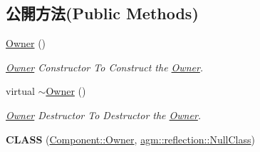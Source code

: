 \subsection*{公開方法(Public Methods)}
\begin{DoxyCompactItemize}
\item 
\hyperlink{class_magnum_1_1_component_1_1_owner_aca1a7487123900c93da0de29a5974f8b}{Owner} ()\hypertarget{class_magnum_1_1_component_1_1_owner_aca1a7487123900c93da0de29a5974f8b}{}\label{class_magnum_1_1_component_1_1_owner_aca1a7487123900c93da0de29a5974f8b}

\begin{DoxyCompactList}\small\item\em \hyperlink{class_magnum_1_1_component_1_1_owner}{Owner} Constructor To Construct the \hyperlink{class_magnum_1_1_component_1_1_owner}{Owner}. \end{DoxyCompactList}\item 
virtual \hyperlink{class_magnum_1_1_component_1_1_owner_af1b9c8d2c072df49f7db39592e016b44}{$\sim$\+Owner} ()\hypertarget{class_magnum_1_1_component_1_1_owner_af1b9c8d2c072df49f7db39592e016b44}{}\label{class_magnum_1_1_component_1_1_owner_af1b9c8d2c072df49f7db39592e016b44}

\begin{DoxyCompactList}\small\item\em \hyperlink{class_magnum_1_1_component_1_1_owner}{Owner} Destructor To Destructor the \hyperlink{class_magnum_1_1_component_1_1_owner}{Owner}. \end{DoxyCompactList}\item 
{\bfseries C\+L\+A\+SS} (\hyperlink{class_magnum_1_1_component_1_1_owner}{Component\+::\+Owner}, \hyperlink{classagm_1_1reflection_1_1_null_class}{agm\+::reflection\+::\+Null\+Class})\hypertarget{class_magnum_1_1_component_1_1_owner_a9d9a7e6b24dccb3554a47da90e914d0c}{}\label{class_magnum_1_1_component_1_1_owner_a9d9a7e6b24dccb3554a47da90e914d0c}


\end{DoxyCompactItemize}

